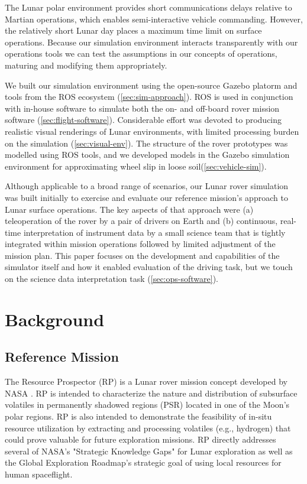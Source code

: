 \documentclass[twocolumn,letterpaper]{IEEEAerospaceCLS}  %
\begin{document}
The Lunar polar environment provides short communications delays relative to Martian operations, which enables semi-interactive vehicle commanding.  
However, the relatively short Lunar day places a maximum time limit on surface operations.  
Because our simulation environment interacts transparently with our operations tools we can test the assumptions in our concepts of operations, maturing and modifying them appropriately.

We built our simulation environment using the open-source Gazebo platorm and tools from the ROS ecosystem (\cref{sec:sim-approach}). 
ROS is used in conjunction with in-house software to simulate both the on- and off-board rover mission software (\cref{sec:flight-software}).  
Considerable effort was devoted to producing realistic visual renderings of Lunar environments, with limited processing burden on the simulation (\cref{sec:visual-env}).  
The structure of the rover prototypes was modelled using ROS tools, and we developed models in the Gazebo simulation environment for approximating wheel slip in loose soil(\cref{sec:vehicle-sim}).  

Although applicable to a broad range of scenarios, our Lunar rover simulation was built initially to exercise and evaluate our reference mission's approach to Lunar surface operations.
The key aspects of that approach were (a) teleoperation of the rover by a pair of drivers on Earth and (b) continuous, real-time interpretation of instrument data by a small science team that is tightly integrated within mission operations followed by limited adjustment of the mission plan.
This paper focuses on the development and capabilities of the simulator itself and how it enabled evaluation of the driving task, but we touch on the science data interpretation task (\cref{sec:ops-software}).

\section{Background}
\label{sec:background}

\subsection{Reference Mission}
The Resource Prospector (RP) is a Lunar rover mission concept developed by NASA \cite{andrews2015resource,colaprete2015resource}. RP is intended to characterize the nature and distribution of subsurface volatiles in permanently shadowed regions (PSR) located in one of the Moon's polar regions. RP is also intended to demonstrate the feasibility of in-situ resource utilization by extracting and processing volatiles (e.g., hydrogen) that could prove valuable for future exploration missions. RP directly addresses several of NASA's "Strategic Knowledge Gaps" for Lunar exploration as well as the Global Exploration Roadmap's strategic goal of using local resources for human spaceflight.
\end{document}

